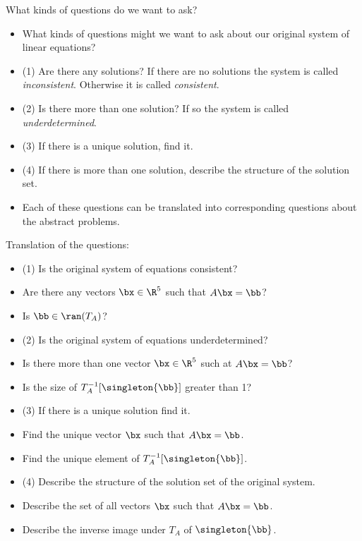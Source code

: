 \documentclass{beamer}
\begin{document}

\begin{frame}{What kinds of questions do we want to ask?}

\begin{itemize}
\item What kinds of questions might we want to ask about our original system of linear equations?
\item (1) Are there any solutions?
If there are no solutions the system is called \emph{inconsistent}. Otherwise it is called \emph{consistent}.
\item (2) Is there more than one solution? If so the system is called
\emph{underdetermined}.
\item (3) If there is a unique solution, find it.
\item (4) If there is more than one solution, describe the structure of the
solution set.
\item Each of these questions can be translated into corresponding questions
about the abstract problems.
\end{itemize}

\end{frame}


\begin{frame}{Translation of the questions:}

\begin{itemize}
\item (1) Is the original system of equations consistent?
\item Are there any vectors $\bx\in\R^5$ such that $A \bx = \bb$?
\item Is $\bb\in\ran(T_A)$?
\item (2) Is the original system of equations underdetermined?
\item Is there more than one vector $\bx\in\R^5$ such at $A \bx = \bb$?
\item Is the size of $T_A^{-1}[\singleton{\bb}]$ greater than 1?
\item (3) If there is a unique solution find it.
\item Find the unique vector $\bx$ such that $A\bx = \bb$.
\item Find the unique element of $T_A^{-1}[\singleton{\bb}]$.
\item (4) Describe the structure of the solution set of the original system.
\item Describe the set of all vectors $\bx$ such that $A\bx = \bb$.
\item Describe the inverse image under $T_A$ of $\singleton{\bb}$.

\end{itemize}

\end{frame}
\end{document}
